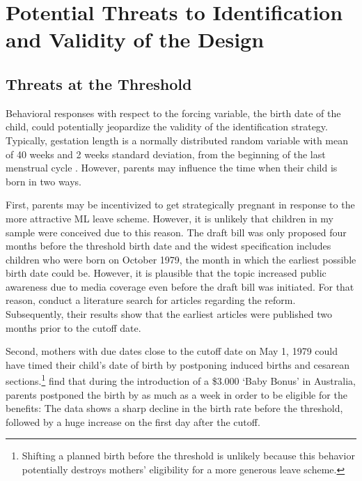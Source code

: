 





\bigskip
\section{Potential Threats to Identification and Validity of the Design}\label{sec_mlch:empirical_strategy_threats+validity}


\subsection{Threats at the Threshold}
Behavioral responses with respect to the forcing variable, the birth date of the child, could potentially jeopardize the validity of the identification strategy. Typically, gestation length is a normally distributed random variable with mean of 40 weeks and 2 weeks standard deviation, from the beginning of the last menstrual cycle \citep{Ekberg2013parental}. However, parents may influence the time when their child is born in two ways. 

First, parents may be incentivized to get strategically pregnant in response to the more attractive ML leave scheme. However, it is unlikely that children in my sample were conceived due to this reason. The draft bill was only proposed four months before the threshold birth date and the widest specification includes children who were born on October 1979, the month in which the earliest possible birth date could be. However, it is plausible that the topic increased public awareness due to media coverage even before the draft bill was initiated. For that reason, \cite{Dustmann2012} conduct a literature search for articles regarding the reform. Subsequently, their results show that the earliest articles were published two months prior to the cutoff date.

Second, mothers with due dates close to the cutoff date on May 1, 1979 could have timed their child's date of birth by postponing induced births and cesarean sections.\footnote{Shifting a planned birth before the threshold is unlikely because this behavior potentially destroys mothers' eligibility for a more generous leave scheme.} \cite{gans2009born} find that during the introduction of a \$3.000 `Baby Bonus' in Australia, parents postponed the birth by as much as a week in order to be eligible for the benefits: The data shows a sharp decline in the birth rate before the threshold, followed by a huge increase on the first day after the cutoff.

